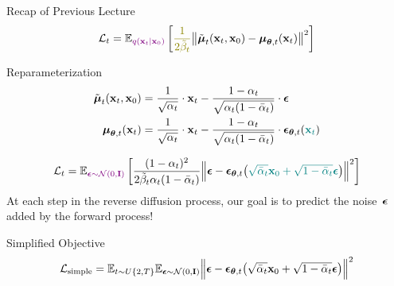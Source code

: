 \documentclass{beamer}
\begin{document}
\begin{frame}{Recap of Previous Lecture}
	\vspace{-0.3cm}
	\[
		\cL_t = \bbE_{\color{violet}q(\bx_t | \bx_0)} \left[ {\color{olive}\frac{1}{2\tilde{\beta}_t}} \bigl\| \tilde{\bmu}_t(\bx_t, \bx_0) - \bmu_{\btheta, t}(\bx_t) \bigr\|^2  \right]
	\]
	\vspace{-0.3cm}
	\begin{block}{Reparameterization}
		\vspace{-0.7cm}
		\begin{align*}
			\tilde{\boldsymbol{\mu}}_t(\mathbf{x}_t, \mathbf{x}_0) &= \frac{1}{\sqrt{\alpha_t}} \cdot \mathbf{x}_t - \frac{1 - \alpha_t}{\sqrt{\alpha_t (1 - \bar{\alpha}_t)}} \cdot \boldsymbol{\epsilon} \\
			\boldsymbol{\mu}_{\boldsymbol{\theta}, t}(\mathbf{x}_t) &= \frac{1}{\sqrt{\alpha_t}} \cdot \mathbf{x}_t - \frac{1 - \alpha_t}{\sqrt{\alpha_t (1 - \bar{\alpha}_t)}} \cdot \boldsymbol{\epsilon}_{\boldsymbol{\theta}, t}({\color{teal}\mathbf{x}_t})
		\end{align*}
		\vspace{-0.7cm}
	\end{block}
	\vspace{-0.2cm}
	\[
		\mathcal{L}_t  =	 \mathbb{E}_{\color{violet}\boldsymbol{\epsilon} \sim \mathcal{N}(0, \mathbf{I})} \left[ \frac{(1 - \alpha_t)^2}{2\tilde{\beta}_t \alpha_t (1 - \bar{\alpha}_t)} \Bigl\| \boldsymbol{\epsilon} - \boldsymbol{\epsilon}_{\boldsymbol{\theta}, t}\bigl( {\color{teal}\sqrt{\bar{\alpha}_t} \mathbf{x}_0 + \sqrt{1 - \bar{\alpha}_t} \boldsymbol{\epsilon}}\bigr) \Bigr\|^2 \right]
	\]
	At each step in the reverse diffusion process, our goal is to predict the noise~$\boldsymbol{\epsilon}$ added by the forward process!
	\begin{block}{Simplified Objective}
		\vspace{-0.7cm}
		\[
			 \mathcal{L}_{\text{simple}} = \mathbb{E}_{t \sim U\{2, T\}} \mathbb{E}_{\boldsymbol{\epsilon} \sim \mathcal{N}(0, \mathbf{I})} \Bigl\| \boldsymbol{\epsilon} - \boldsymbol{\epsilon}_{\boldsymbol{\theta}, t}\bigl( \sqrt{\bar{\alpha}_t} \mathbf{x}_0 + \sqrt{1 - \bar{\alpha}_t} \boldsymbol{\epsilon}\bigr) \Bigr\|^2 
		\]
	\end{block}
\end{frame}
\end{document}
